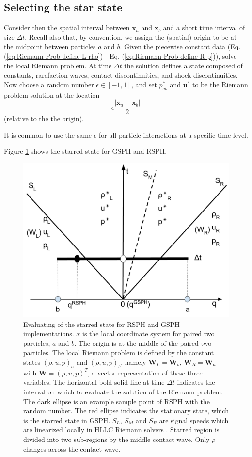 \subsection{Selecting the star state} \label{sec:Picking-up-single-state}
Consider then the spatial interval between $\textbf{x}_{a}$ and $\textbf{x}_{ b}$ and a short time interval of size $\Delta t$. Recall also that, by convention, we assign the (spatial) origin to be at the midpoint between particles $a$ and $b$.
Given the piecewise constant data (Eq. (\ref{eq:Riemann-Prob-define-L-rho}) - Eq. (\ref{eq:Riemann-Prob-define-R-p})), solve the local Riemann problem. At time $\Delta t$ the solution defines a state composed of constants, rarefaction waves, contact discontinuities, and shock discontinuities. 
Now choose a random number $\epsilon \in [-1,1]$, and set $p_{a b}^{\ast}$ and $\textbf{u}^{\ast}$ to be the Riemann problem solution at the location 
$$
\epsilon \frac{|\textbf{x}_{a} - \textbf{x}_{ b}|}{2}
$$
(relative to the the origin).

It is common to use the same $\epsilon$ for all particle interactions at a specific time level.

Figure \ref{fig:pick-up-state-GSPH-RSPH} shows the starred state for GSPH and RSPH.
\begin{figure}[H]
    \center
	\includegraphics[width=0.5 \textwidth]{./Figures/RSPH-GSPH}
    \caption{Evaluating of the starred state for RSPH and GSPH implementations. $x$ is the local coordinate system for paired two particles, $a$ and $b$. The origin is at the middle of the paired two particles.
The local Riemann problem is defined by the constant states $(\rho, u, p)_a$ and $(\rho, u,p)_b$, namely $\textbf{W}_L = \textbf{W}_b$, $\textbf{W}_R = \textbf{W}_a$ with $\textbf{W} = (\rho, u,p)^T $, a vector representation of these three variables. The horizontal bold solid line at time $\Delta t$ indicates the interval on which to evaluate the solution of the Riemann problem. The dark ellipse is an example sample point of RSPH with the random number. The red ellipse indicates the stationary state, which is the starred state in GSPH. $S_L$, $S_M$ and $S_R$ are signal speeds which are linearized locally in HLLC Riemann solvers \citep{puri2014approximate}. Starred region is divided into two sub-regions by the middle contact wave. Only $\rho$ changes across the contact wave.}
    \label{fig:pick-up-state-GSPH-RSPH}
\end{figure}


